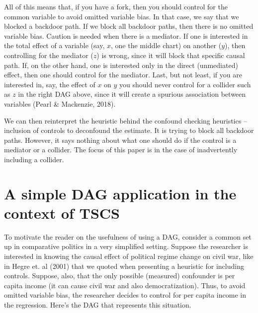 \documentclass[
  super,
  preprint,
  3p]{elsarticle}
\begin{document}
All of this means that, if you have a fork, then you should control for
the common variable to avoid omitted variable bias. In that case, we say
that we blocked a backdoor path. If we block all backdoor paths, then
there is no omitted variable bias. Caution is needed when there is a
mediator. If one is interested in the total effect of a variable (say,
\(x\), one the middle chart) on another (\(y\)), then controlling for
the mediator (\(z\)) is wrong, since it will block that specific causal
path. If, on the other hand, one is interested only in the direct
(unmediated) effect, then one should control for the mediator. Last, but
not least, if you are interested in, say, the effect of \(x\) on \(y\)
you should never control for a collider such as \(z\) in the right DAG
above, since it will create a spurious association between variables
(Pearl \& Mackenzie, 2018).

We can then reinterpret the heuristic behind the confound checking
heuristics -- inclusion of controls to deconfound the estimate. It is
trying to block all backdoor paths. However, it says nothing about what
one should do if the control is a mediator or a collider. The focus of
this paper is in the case of inadvertently including a collider.

\hypertarget{a-simple-dag-application-in-the-context-of-tscs}{%
\section{A simple DAG application in the context of
TSCS}\label{a-simple-dag-application-in-the-context-of-tscs}}

To motivate the reader on the usefulness of using a DAG, consider a
common set up in comparative politics in a very simplified setting.
Suppose the researcher is interested in knowing the causal effect of
political regime change on civil war, like in Hegre et. al (2001) that
we quoted when presenting a heuristic for including controls. Suppose,
also, that the only possible (measured) confounder is per capita income
(it can cause civil war and also democratization). Thus, to avoid
omitted variable bias, the researcher decides to control for per capita
income in the regression. Here's the DAG that represents this situation.
\end{document}
